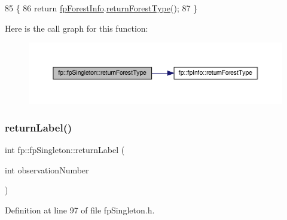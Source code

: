\begin{DoxyCode}
85                                                 \{
86                 \textcolor{keywordflow}{return} \hyperlink{classfp_1_1fpSingleton_a85965009befa72a749ae498fa5b6ccfa}{fpForestInfo}.\hyperlink{classfp_1_1fpInfo_a97280e7e3cadc5e653d8ef256eb2c82d}{returnForestType}();
87             \}
\end{DoxyCode}
Here is the call graph for this function\+:\nopagebreak
\begin{figure}[H]
\begin{center}
\leavevmode
\includegraphics[width=350pt]{classfp_1_1fpSingleton_af7582b20b48b7eb8c0a6b89fbdf170ab_cgraph}
\end{center}
\end{figure}
\mbox{\label{classfp_1_1fpSingleton_aa2f644b1521948fb994f4087ddfaea14}} 
\subsubsection{\texorpdfstring{return\+Label()}{returnLabel()}}
{\footnotesize\ttfamily int fp\+::fp\+Singleton\+::return\+Label (\begin{DoxyParamCaption}\item[{int}]{observation\+Number }\end{DoxyParamCaption})\hspace{0.3cm}{\ttfamily [inline]}}



Definition at line 97 of file fp\+Singleton.\+h.


